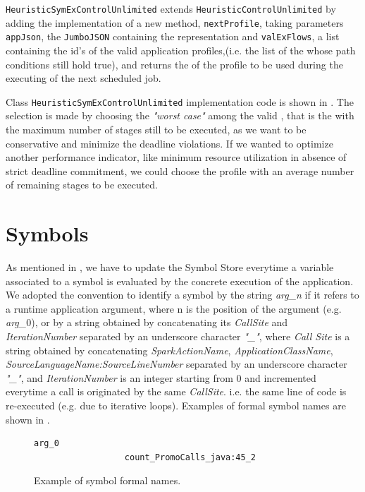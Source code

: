 \texttt{HeuristicSymExControlUnlimited} extends \texttt{HeuristicControlUnlimited} by adding the implementation of a new method, \texttt{nextProfile}, taking parameters \texttt{appJson}, the \texttt{JumboJSON} containing the \model representation and \texttt{valExFlows}, a list containing the id's of the valid application profiles,(i.e. the list of the \plans whose path conditions still hold true), and returns the \plan of the profile to be used during the executing of the next scheduled job.

Class \texttt{HeuristicSymExControlUnlimited} implementation code is shown in . The \plan selection is made by choosing the \textit{"worst case"} among the valid \plans, that is the \plan with the maximum number of stages still to be executed, as we want to be conservative and minimize the deadline violations. If we wanted to optimize another performance indicator, like minimum  resource utilization in absence of strict deadline commitment, we could choose the profile with an average number of remaining stages to be executed. 
  
\section{Symbols}\label{sec:symbols}
As mentioned in , we have to update the Symbol Store everytime a variable associated to a symbol is evaluated by the concrete execution of the application. We adopted the convention to identify a symbol by the string \textit{arg\_n} if it refers to a runtime application argument, where n is the position of the argument (e.g. \textit{arg\_$0$}), or by a string obtained by concatenating its \textit{CallSite} and \textit{IterationNumber} separated by an underscore character \textit{"\_"}, where \textit{Call Site} is a string obtained by concatenating \textit{SparkActionName}, \textit{ApplicationClassName}, \textit{SourceLanguageName:SourceLineNumber} separated by an underscore character \textit{"\_"}, and  \textit{IterationNumber} is an integer starting from $0$ and incremented everytime a call is originated by the same \textit{CallSite}. i.e. the same line of code is re-executed (e.g. due to iterative loops). Examples of formal symbol names are shown in .
\begin{figure}[tbhp]
	\centering
	\begin{lstlisting}[basicstyle=\ttfamily\scriptsize]
		          arg_0
		          count_PromoCalls_java:45_2
	\end{lstlisting}
	\caption{Example of symbol formal names.}
	\label{fig:symbol_name}
\end{figure}

